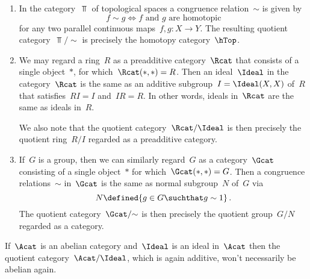 \begin{example*}
  \leavevmode
  \begin{enumerate}
    \item
      In the category~$\Top$ of topological spaces a congruence relation~$\sim$ is given by
      \[
              f \sim g
        \iff  \text{$f$ and~$g$ are homotopic}
      \]
      for any two parallel continuous maps~$f, g \colon X \to Y$.
      The resulting quotient category~$\Top/{\sim}$ is precisely the homotopy category~$\hTop$.
    \item
      We may regard a ring~$R$ as a preadditive category~$\Rcat$ that consists of a single object~$\ast$, for which~$\Rcat(\ast, \ast) = R$.
      Then an ideal~$\Ideal$ in the category~$\Rcat$ is the same as an additive subgroup~$I = \Ideal(X,X)$ of~$R$ that satisfies~$RI = I$ and~$IR = R$.
      In other words, ideals in~$\Rcat$ are the same as {\twosided} ideals in~$R$.
      
      We also note that the quotient category~$\Rcat/\Ideal$ is then precisely the quotient ring~$R/I$ regarded as a  preadditive category.
    \item
      If~$G$ is a group, then we can similarly regard~$G$ as a category~$\Gcat$ consisting of a single object~$\ast$ for which~$\Gcat(\ast,\ast) = G$.
      Then a congruence relations~$\sim$ in~$\Gcat$ is the same as normal subgroup~$N$ of~$G$ via
      \[
                  N
        \defined  \{
                    g \in G
                  \suchthat
                    g \sim 1
                  \} \,.
      \]
      The quotient category~$\Gcat/{\sim}$ is then precisely the quotient group~$G/N$ regarded as a  category.
  \end{enumerate}
\end{example*}


\begin{warning*}
  If~$\Acat$ is an abelian category and~$\Ideal$ is an ideal in~$\Acat$ then the quotient category~$\Acat/\Ideal$, which is again additive, won’t necessarily be abelian again.
\end{warning*}


